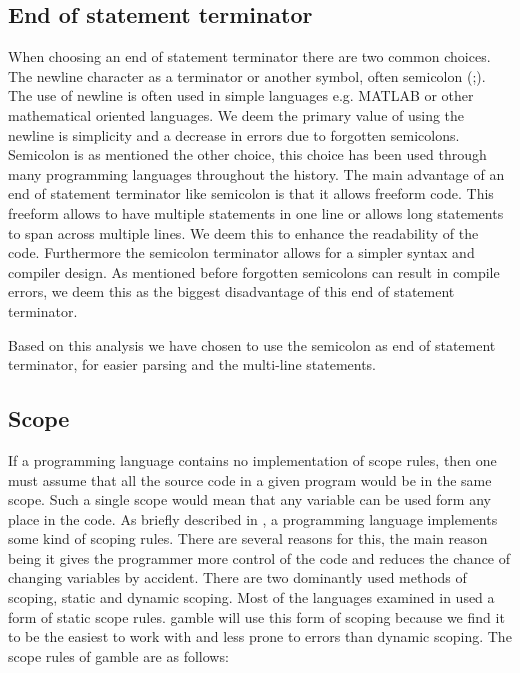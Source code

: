 \subsection*{End of statement terminator}
When choosing an end of statement terminator there are two common choices.
The newline character as a terminator or another symbol, often semicolon (;).
The use of newline is often used in simple languages e.g. MATLAB or other mathematical oriented languages. 
We deem the primary value of using the newline is simplicity and a decrease in errors due to forgotten semicolons.
Semicolon is as mentioned the other choice, this choice has been used through many programming languages throughout the history. 
The main advantage of an end of statement terminator like semicolon is that it allows freeform code. 
This freeform allows to have multiple statements in one line or allows long statements to span across multiple lines.
We deem this to enhance the readability of the code.
Furthermore the semicolon terminator allows for a simpler syntax and compiler design. 
As mentioned before forgotten semicolons can result in compile errors, we deem this as the biggest disadvantage of this end of statement terminator.

Based on this analysis we have chosen to use the semicolon as end of statement terminator, for easier parsing and the multi-line statements.

\subsection*{Scope}\label{subsec:Scope}
If a programming language contains no implementation of scope rules, then one must assume that all the source code in a given program would be in the same scope.
Such a single scope would mean that any variable can be used form any place in the code. 
As briefly described in , a programming language implements some kind of scoping rules.
There are several reasons for this, the main reason being it gives the programmer more control of the code and reduces the chance of changing variables by accident.
There are two dominantly used methods of scoping, static and dynamic scoping.
Most of the languages examined in  used a form of static scope rules. 
\gls{gamble} will use this form of scoping because we find it to be the easiest to work with and less prone to errors than dynamic scoping.
The scope rules of \gls{gamble} are as follows:

